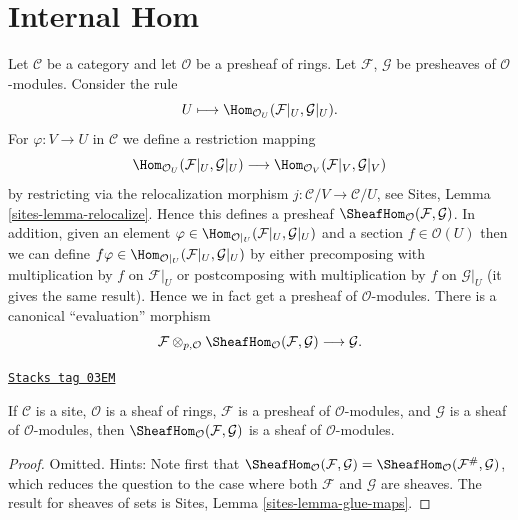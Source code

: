 \section{Internal Hom}
\label{sites-modules-section-internal-hom}
Let $\mathcal{C}$ be a category and let $\mathcal{O}$ be a presheaf
of rings. Let $\mathcal{F}$, $\mathcal{G}$ be presheaves of
$\mathcal{O}$-modules. Consider the rule
$$
U \longmapsto \Hom_{\mathcal{O}_U}(\mathcal{F}|_U, \mathcal{G}|_U).
$$
For $\varphi : V \to U$ in $\mathcal{C}$ we define a restriction mapping
$$
\Hom_{\mathcal{O}_U}(\mathcal{F}|_U, \mathcal{G}|_U)
\longrightarrow
\Hom_{\mathcal{O}_V}(\mathcal{F}|_V, \mathcal{G}|_V)
$$
by restricting via the relocalization morphism
$j : \mathcal{C}/V \to \mathcal{C}/U$, see
Sites, Lemma \ref{sites-lemma-relocalize}. Hence this defines a
presheaf $\SheafHom_\mathcal{O}(\mathcal{F}, \mathcal{G})$.
In addition, given an element
$\varphi \in \Hom_{\mathcal{O}|_U}(\mathcal{F}|_U, \mathcal{G}|_U)$
and a section $f \in \mathcal{O}(U)$ then we can define
$f\varphi \in \Hom_{\mathcal{O}|_U}(\mathcal{F}|_U, \mathcal{G}|_U)$
by either precomposing with multiplication by $f$ on $\mathcal{F}|_U$
or postcomposing with multiplication by $f$ on $\mathcal{G}|_U$ (it gives
the same result). Hence we in fact get a presheaf of $\mathcal{O}$-modules.
There is a canonical ``evaluation'' morphism
$$
\mathcal{F}
\otimes_{p, \mathcal{O}}
\SheafHom_\mathcal{O}(\mathcal{F}, \mathcal{G})
\longrightarrow
\mathcal{G}.
$$

\begin{lemma}
\label{sites-modules-lemma-internal-hom}
\href{https://stacks.math.columbia.edu/tag/03EM}{\texttt{Stacks tag 03EM}}

If $\mathcal{C}$ is a site, $\mathcal{O}$ is a sheaf of rings,
$\mathcal{F}$ is a presheaf of $\mathcal{O}$-modules, and
$\mathcal{G}$ is a sheaf of $\mathcal{O}$-modules, then
$\SheafHom_\mathcal{O}(\mathcal{F}, \mathcal{G})$
is a sheaf of $\mathcal{O}$-modules.
\end{lemma}

\begin{proof}
Omitted. Hints: Note first that
$\SheafHom_\mathcal{O}(\mathcal{F}, \mathcal{G})
= \SheafHom_\mathcal{O}(\mathcal{F}^\#, \mathcal{G})$, which reduces
the question to the case where both $\mathcal{F}$ and $\mathcal{G}$
are sheaves. The result for sheaves of sets is
Sites, Lemma \ref{sites-lemma-glue-maps}.
\end{proof}

